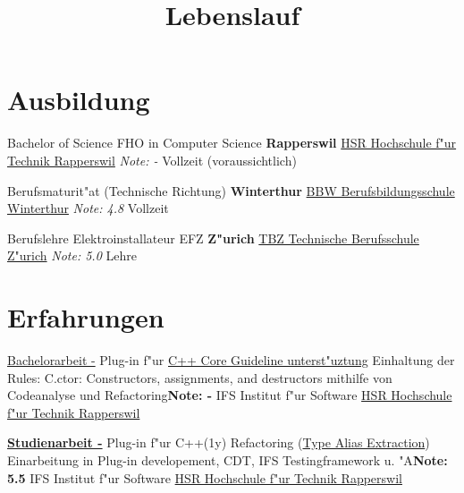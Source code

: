 \documentclass[11pt,legalpaper,sans]{moderncv}
\title{Lebenslauf}
\begin{document}
\makecvtitle

\section{Ausbildung}
{Bachelor of Science FHO in Computer Science}
{\hfill\bfseries Rapperswil}
{\newline{}\href{http://www.hsr.ch/}{HSR Hochschule f"ur Technik Rapperswil}}
{\hfill\textit{Note: -}}
{Vollzeit (voraussichtlich)}

{Berufsmaturit"at (Technische Richtung)}
{\hfill\bfseries Winterthur}
{\newline{}\href{http://www.bbw.ch/}{BBW Berufsbildungsschule Winterthur}}
{\hfill\textit{Note: 4.8}}
{Vollzeit}

{Berufslehre Elektroinstallateur EFZ}
{\hfill\bfseries Z"urich}
{\newline{}\href{htttp://www.tbz.ch/}{TBZ Technische Berufsschule Z"urich}}
{\hfill\textit{Note: 5.0}}
{Lehre}

\section{Erfahrungen}
{\href{http://sinv-56012.edu.hsr.ch/ccglator}{Bachelorarbeit -} Plug-in f"ur \href{https://github.com/isocpp/CppCoreGuidelines/blob/master/CppCoreGuidelines.md}{C++ Core Guideline unterst"uztung}}{}
{\newline{}Einhaltung der Rules: C.ctor: Constructors, assignments, and destructors mithilfe von Codeanalyse und Refactoring}{\hfill \textbf{Note: -}}
{IFS Institut f"ur Software \hfill\href{http://www.hsr.ch/}{HSR Hochschule f"ur Technik Rapperswil}}

{\href{http://sinv-56012.edu.hsr.ch/aliextor}{\textbf{Studienarbeit -}} Plug-in f"ur C++(1y) Refactoring (\href{http://sinv-56012.edu.hsr.ch/video.mp4}{Type Alias Extraction})}{}
{\newline{}Einarbeitung in Plug-in developement, CDT, IFS Testingframework u. "A}{\hfill \textbf{Note: 5.5}}
{IFS Institut f"ur Software \hfill\href{http://www.hsr.ch/}{HSR Hochschule f"ur Technik Rapperswil}}
\end{document}

